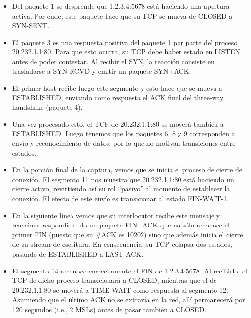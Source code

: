 \subsubsection{}
\begin{itemize}
\item Del paquete 1 se desprende que 1.2.3.4:5678 está haciendo una apertura activa. Por ende, este paquete hace que su TCP se mueva de CLOSED a SYN-SENT.
\item El paquete 3 es una respuesta positiva del paquete 1 por parte del proceso 20.232.1.1:80. Para que esto ocurra, su TCP debe haber estado en LISTEN antes de poder contestar. Al recibir el SYN, la reacción consiste en trasladarse a SYN-RCVD y emitir un paquete SYN+ACK.
\item El primer host recibe luego este segmento y esto hace que se mueva a ESTABLISHED, enviando como respuesta el ACK final del three-way handshake (paquete 4).
\item Una vez procesado esto, el TCP de 20.232.1.1:80 se moverá también a ESTABLISHED. Luego tenemos que los paquetes 6, 8 y 9 corresponden a envío y reconocimiento de datos, por lo que no motivan transiciones entre estados.
\item En la porción final de la captura, vemos que se inicia el proceso de cierre de conexión. El segmento 11 nos muestra que 20.232.1.1:80 está haciendo un cierre activo, revirtiendo así su rol “pasivo” al momento de establecer la conexión. El efecto de este envío es transicionar al estado FIN-WAIT-1.
\item En la siguiente línea vemos que su interlocutor recibe este mensaje y reacciona respondien- do un paquete FIN+ACK que no sólo reconoce el primer FIN (puesto que su \#ACK es 10202) sino que además inicia el cierre de su stream de escritura. En consecuencia, su TCP colapsa dos estados, pasando de ESTABLISHED a LAST-ACK.
\item El segmento 14 reconoce correctamente el FIN de 1.2.3.4:5678. Al recibirlo, el TCP de dicho proceso transicionará a CLOSED, mientras que el de 20.232.1.1:80 se moverá a TIME-WAIT como respuesta al segmento 12. Asumiendo que el último ACK no se extravía en la red, allí permanecerá por 120 segundos (i.e., 2 MSLs) antes de pasar también a CLOSED.
\end{itemize}

\setcounter{subsection}{6}
\subsection{}
